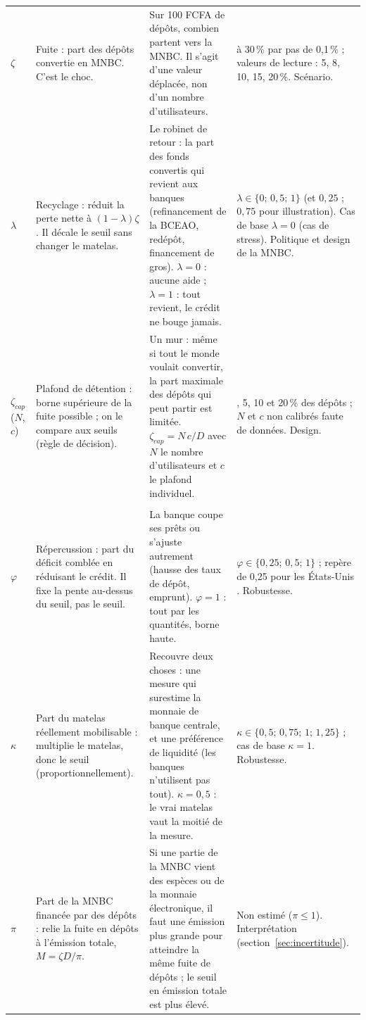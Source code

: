 \documentclass[11pt,a4paper]{article}
\begin{document}
{\begin{longtable}{>{\raggedright\arraybackslash}p{2.0cm}>{\raggedright\arraybackslash}p{4.1cm}>{\raggedright\arraybackslash}p{5.4cm}>{\raggedright\arraybackslash}p{3.8cm}}
			\midrule
			\multicolumn{4}{l}{\textbf{B. Paramètres de scénario (non observables)}}\\
			\midrule
			$\zeta$ & Fuite : part des dépôts convertie en MNBC. C'est le choc. & Sur 100 FCFA de dépôts, combien partent vers la MNBC. Il s'agit d'une valeur déplacée, non d'un nombre d'utilisateurs. & 0 à 30\,\% par pas de 0,1\,\% ; valeurs de lecture : 5, 8, 10, 15, 20\,\%. Scénario. \\
			\addlinespace
			$\lambda$ & Recyclage : réduit la perte nette à $(1-\lambda)\zeta$. Il décale le seuil sans changer le matelas. & Le robinet de retour : la part des fonds convertis qui revient aux banques (refinancement de la BCEAO, redépôt, financement de gros). $\lambda=0$ : aucune aide ; $\lambda=1$ : tout revient, le crédit ne bouge jamais. & $\lambda\in\{0;\,0{,}5;\,1\}$ (et $0{,}25$ ; $0{,}75$ pour illustration). Cas de base $\lambda=0$ (cas de stress). Politique et design de la MNBC. \\
			\addlinespace
			$\zeta_{cap}$ ($N$, $c$) & Plafond de détention : borne supérieure de la fuite possible ; on le compare aux seuils (règle de décision). & Un mur : même si tout le monde voulait convertir, la part maximale des dépôts qui peut partir est limitée. $\zeta_{cap}=N\,c/D$ avec $N$ le nombre d'utilisateurs et $c$ le plafond individuel. & 2, 5, 10 et 20\,\% des dépôts ; $N$ et $c$ non calibrés faute de données. Design. \\
			\midrule
			\multicolumn{4}{l}{\textbf{C. Paramètres de robustesse (hypothèses fragiles)}}\\
			\midrule
			$\varphi$ & Répercussion : part du déficit comblée en réduisant le crédit. Il fixe la pente au-dessus du seuil, pas le seuil. & La banque coupe ses prêts ou s'ajuste autrement (hausse des taux de dépôt, emprunt). $\varphi=1$ : tout par les quantités, borne haute. & $\varphi\in\{0{,}25;\,0{,}5;\,1\}$ ; repère de 0,25 pour les États-Unis \citep{whited2023}. Robustesse. \\
			\addlinespace
			$\kappa$ & Part du matelas réellement mobilisable : multiplie le matelas, donc le seuil (proportionnellement). & Recouvre deux choses : une mesure qui surestime la monnaie de banque centrale, et une préférence de liquidité (les banques n'utilisent pas tout). $\kappa=0{,}5$ : le vrai matelas vaut la moitié de la mesure. & $\kappa\in\{0{,}5;\,0{,}75;\,1;\,1{,}25\}$ ; cas de base $\kappa=1$. Robustesse. \\
			\addlinespace
			$\pi$ & Part de la MNBC financée par des dépôts : relie la fuite en dépôts à l'émission totale, $M=\zeta D/\pi$. & Si une partie de la MNBC vient des espèces ou de la monnaie électronique, il faut une émission plus grande pour atteindre la même fuite de dépôts ; le seuil en émission totale est plus élevé. & Non estimé ($\pi\le1$). Interprétation (section~\ref{sec:incertitude}). \\

\end{longtable}}
\end{document}
